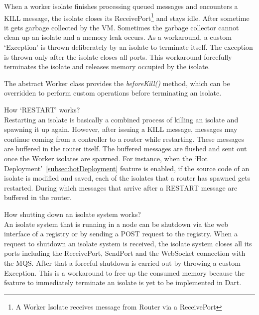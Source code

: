 \begin{description}
    When a worker isolate finishes processing queued messages and encounters a KILL message, the isolate closes its ReceivePort\footnote{A Worker Isolate receives message from Router via a ReceivePort} and stays idle. After sometime it gets garbage collected by the VM. Sometimes the garbage collector cannot clean up an isolate and a memory leak occurs. As a workaround, a custom ‘Exception’ is thrown deliberately by an isolate to terminate itself. The exception is thrown only after the isolate closes all ports. This workaround forcefully terminates the isolate and releases memory occupied by the isolate.

    The abstract Worker class provides the \emph{beforeKill()} method, which can be overridden to perform custom operations before terminating an isolate.

    \item How ‘RESTART’ works?\\
    Restarting an isolate is basically a combined process of killing an isolate and spawning it up again. However, after issuing a KILL message, messages may continue coming from a controller to a router while restarting. These messages are buffered in the router itself. The buffered messages are flushed and sent out once the Worker isolates are spawned. For instance, when the ‘Hot Deployment’~\autoref{subsec:hotDeployment} feature is enabled, if the source code of an isolate is modified and saved, each of the isolates that a router has spawned gets restarted. During which messages that arrive after a RESTART message are buffered in the router.

    \item How shutting down an isolate system works?\\
    An isolate system that is running in a node can be shutdown via the web interface of a registry or by sending a POST request to the registry. When a request to shutdown an isolate system is received, the isolate system closes all its ports including the ReceivePort, SendPort and the WebSocket connection with the MQS. After that a forceful shutdown is carried out by throwing a custom Exception. This is a workaround to free up the consumed memory because the feature to immediately terminate an isolate is yet to be implemented in Dart.
  \end{description}

